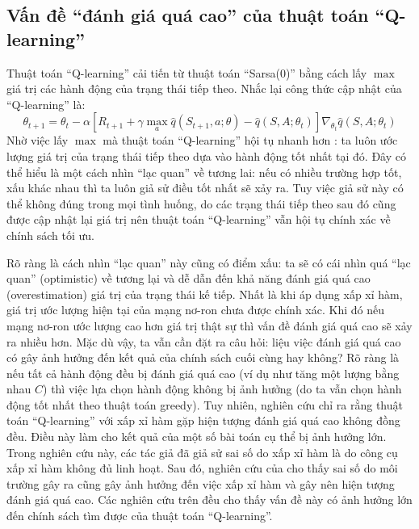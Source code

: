 \subsection{Vấn đề ``đánh giá quá cao'' của thuật toán ``Q-learning''}
	Thuật toán ``Q-learning'' cải tiến từ thuật toán ``Sarsa(0)'' bằng cách lấy $\max$ giá trị các hành động của trạng thái tiếp theo.
	Nhắc lại công thức cập nhật của ``Q-learning'' là:
	\begin{equation}
		\theta_{t+1} = \theta_t - \alpha \left[ R_{t+1} + \gamma \max_{a}\hat{q}(S_{t+1}, a;\theta) - \hat{q}(S,A;\theta_t) \right] \nabla_{\theta_t} \hat{q}(S, A;\theta_t)	
	\end{equation}
	Nhờ việc lấy $\max$ mà thuật toán ``Q-learning'' hội tụ nhanh hơn \cite{sutton1998introduction}: ta luôn ước lượng giá trị của trạng thái tiếp theo dựa vào hành động tốt nhất tại đó.
	Đây có thể hiểu là một cách nhìn ``lạc quan'' về tương lai: nếu có nhiều trường hợp tốt, xấu khác nhau thì ta luôn giả sử điều tốt nhất sẽ xảy ra.
	Tuy việc giả sử này có thể không đúng trong mọi tình huống, do các trạng thái tiếp theo sau đó cũng được cập nhật lại giá trị nên thuật toán ``Q-learning'' vẫn hội tụ chính xác về chính sách tối ưu.
	
	Rõ ràng là cách nhìn ``lạc quan'' này cũng có điểm xấu: ta sẽ có cái nhìn quá ``lạc quan'' (optimistic) về tương lại và dễ dẫn đến khả năng đánh giá quá cao (overestimation) giá trị của trạng thái kế tiếp.
	Nhất là khi áp dụng xấp xỉ hàm, giá trị ước lượng hiện tại của mạng nơ-ron chưa được chính xác.
	Khi đó nếu mạng nơ-ron ước lượng cao hơn giá trị thật sự thì vấn đề đánh giá quá cao sẽ xảy ra nhiều hơn.
	Mặc dù vậy, ta vẫn cần đặt ra câu hỏi: liệu việc đánh giá quá cao có gây ảnh hưởng đến kết quả của chính sách cuối cùng hay không?
	Rõ ràng là nếu tất cả hành động đều bị đánh giá quá cao (ví dụ như tăng một lượng bằng nhau $C$) thì việc lựa chọn hành động không bị ảnh hưởng (do ta vẫn chọn hành động tốt nhất theo thuật toán greedy).
	Tuy nhiên, nghiên cứu \cite{thrun1993issues} chỉ ra rằng thuật toán ``Q-learning'' với xấp xỉ hàm gặp hiện tượng đánh giá quá cao không đồng đều.
	Điều này làm cho kết quả của một số bài toán cụ thể bị ảnh hưởng lớn.
	Trong nghiên cứu này, các tác giả đã giả sử sai số do xấp xỉ hàm là do công cụ xấp xỉ hàm không đủ linh hoạt.
	Sau đó, nghiên cứu của \cite{hasselt2010double} cho thấy sai số do môi trường gây ra cũng gây ảnh hưởng đến việc xấp xỉ hàm và gây nên hiện tượng đánh giá quá cao.
	Các nghiên cứu trên đều cho thấy vấn đề này có ảnh hưởng lớn đến chính sách tìm được của thuật toán ``Q-learning''.
	
